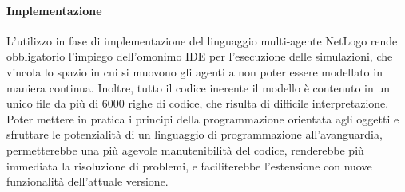 \paragraph{Implementazione}
L'utilizzo in fase di implementazione del linguaggio multi-agente NetLogo rende obbligatorio l'impiego dell'omonimo IDE per l'esecuzione delle simulazioni, che vincola lo spazio in cui si muovono gli agenti a non poter essere modellato in maniera continua. \newline 
Inoltre, tutto il codice inerente il modello è contenuto in un unico file da più di 6000 righe di codice, che risulta di difficile interpretazione. Poter mettere in pratica i principi della programmazione orientata agli oggetti e sfruttare le potenzialità di un linguaggio di programmazione all'avanguardia, permetterebbe una più agevole manutenibilità del codice, renderebbe più immediata la risoluzione di problemi, e faciliterebbe l'estensione con nuove funzionalità dell'attuale versione.